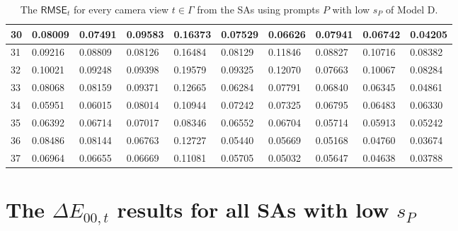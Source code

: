 \begin{table}[H]
{\begin{tabular}{|l|l|l|l|l|l|l|l|l|l|}
        30 & 0.08009 & 0.07491 & 0.09583 & 0.16373 & 0.07529 & 0.06626 & 0.07941 & 0.06742 & 0.04205 \\ \hline
        31 & 0.09216 & 0.08809 & 0.08126 & 0.16484 & 0.08129 & 0.11846 & 0.08827 & 0.10716 & 0.08382 \\ \hline
        32 & 0.10021 & 0.09248 & 0.09398 & 0.19579 & 0.09325 & 0.12070 & 0.07663 & 0.10067 & 0.08284 \\ \hline
        33 & 0.08068 & 0.08159 & 0.09371 & 0.12665 & 0.06284 & 0.07791 & 0.06840 & 0.06345 & 0.04861 \\ \hline
        34 & 0.05951 & 0.06015 & 0.08014 & 0.10944 & 0.07242 & 0.07325 & 0.06795 & 0.06483 & 0.06330 \\ \hline
        35 & 0.06392 & 0.06714 & 0.07017 & 0.08346 & 0.06552 & 0.06704 & 0.05714 & 0.05913 & 0.05242 \\ \hline
        36 & 0.08486 & 0.08144 & 0.06763 & 0.12727 & 0.05440 & 0.05669 & 0.05168 & 0.04760 & 0.03674 \\ \hline
        37 & 0.06964 & 0.06655 & 0.06669 & 0.11081 & 0.05705 & 0.05032 & 0.05647 & 0.04638 & 0.03788 \\ \hline
    \end{tabular}}
	\caption{The $ \mathsf{RMSE}_t$ for every camera view $t \in \varGamma$ from the SAs using prompts $P$ with low $s_P$ of Model D.}
\end{table}

\section{The $ \Delta E_{00,t}$ results for all SAs with low $s_P$}

